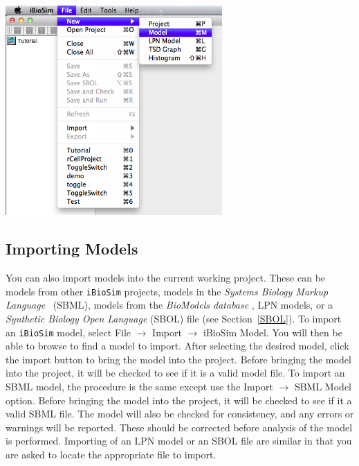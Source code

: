 \documentclass[titlepage,11pt]{article}
\begin{document}
\begin{center}
\includegraphics[height=80mm]{screenshots/newModel}
\end{center}

\clearpage

\subsection{Importing Models}

\noindent
You can also import models into the current working project.  These can be models from other {\tt iBioSim} projects, models in the 
\emph{Systems Biology Markup Language}
~(SBML), models from the
\emph{BioModels database}
, LPN models, or a 
\emph{Synthetic Biology Open Language}
(SBOL) file (see Section~\ref{SBOL}). 
To import an {\tt iBioSim} model, select File $\rightarrow$ Import $\rightarrow$ iBioSim Model.  
You will then be able to browse to find a model to import.  After  selecting the desired model, click the import button to bring the model into the project.  Before bringing the model into the project, it will be checked to see if it is a valid model file.  To import an SBML model, the procedure is the same except use the Import $\rightarrow$ SBML Model option.  Before bringing the model into the project, it will be checked to see if it a valid SBML file.  
The model will also be checked for consistency, and any errors or warnings will be reported.  These should be corrected before analysis of the model is performed.  Importing of an LPN model or an SBOL file are similar in that you are asked to locate the appropriate file to import.
\end{document}
